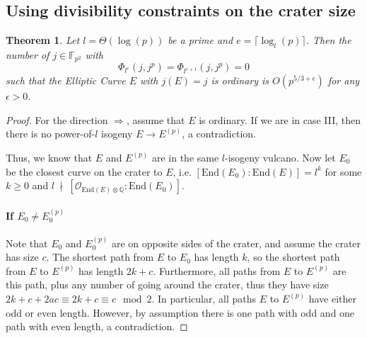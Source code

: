 \documentclass{scrartcl}
\newcommand{\F}{\mathbb{F}}
\newcommand{\End}{\mathrm{End}}
\newcommand{\notdivides}{\ \nmid \ }
\renewcommand{\O}{\mathcal{O}}
\newtheorem{theorem}[prop]{Theorem}
\theoremstyle{definition}
\begin{document}
\subsection{Using divisibility constraints on the crater size}
\begin{theorem}
    Let $l = \Theta(\log(p))$ be a prime and $e = \lceil \log_l(p) \rceil$.
    Then the number of $j \in \F_{p^2}$ with
    \begin{equation*}
        \Phi_{l^e}(j, j^p) = \Phi_{l^{e + 1}}(j, j^p) = 0
    \end{equation*}
    such that the Elliptic Curve $E$ with $j(E) = j$ is ordinary is $O(p^{5/3 + \epsilon})$ for any $\epsilon > 0$.
\end{theorem}
\begin{proof}
    For the direction $\Rightarrow$, assume that $E$ is ordinary.
    If we are in case III, then there is no power-of-$l$ isogeny $E \to E^{(p)}$, a contradiction.

    Thus, we know that $E$ and $E^{(p)}$ are in the same $l$-isogeny vulcano.
    Now let $E_0$ be the closest curve on the crater to $E$, i.e. $[\End(E_0) : \End(E)] = l^k$ for some $k \geq 0$ and $l \notdivides [\O_{\End(E) \otimes \mathbb{Q}} : \End(E_0)]$.
    
    \paragraph*{If $E_0 \neq E_0^{(p)}$} Note that $E_0$ and $E_0^{(p)}$ are on opposite sides of the crater, and assume the crater has size $c$.
    The shortest path from $E$ to $E_0$ has length $k$, so the shortest path from $E$ to $E^{(p)}$ has length $2k + c$.
    Furthermore, all paths from $E$ to $E^{(p)}$ are this path, plus any number of going around the crater, thus they have size $2k + c + 2ac \equiv 2k + c \equiv c \mod 2$.
    In particular, all paths $E$ to $E^{(p)}$ have either odd or even length.
    However, by assumption there is one path with odd and one path with even length, a contradiction.


\end{proof}
\end{document}
